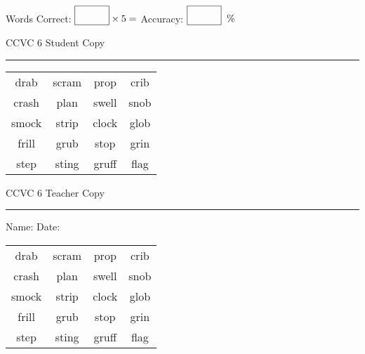 \documentclass{memoir}
\begin{document}
\normalsize

Words Correct: $\fbox{\phantom{\huge 100}} \times 5 = $ Accuracy: $\fbox{\phantom{\huge 100}}\;\; \%$ 

\vfill

\newpage


\footnotesize \noindent
CCVC 6 \hfill Student Copy
\smallskip
\hrule

\Large

\setlength{\tabcolsep}{14pt}
\def\arraystretch{3}

{\selectfont


\begin{vplace}[0.5]
\begin{center}
\begin{tabular}{cccc}
drab             & scram & prop & crib \\
crash & plan & swell & snob \\
smock & strip & clock & glob \\
frill & grub & stop & grin     \\
step & sting & gruff & flag             \\
\end{tabular}
\end{center}
\end{vplace}

}

\newpage

\footnotesize \noindent
CCVC 6 \hfill Teacher Copy
\smallskip
\hrule

\normalsize

\vfill

\noindent
Name: \underline{\hspace{1.75in}} \hfill Date: \underline{\hspace{1in}}

\Large

{\selectfont


\begin{vplace}[0.5]
\begin{center}
\begin{tabular}{cccc}
drab             & scram & prop & crib \\
crash & plan & swell & snob \\
smock & strip & clock & glob \\
frill & grub & stop & grin     \\
step & sting & gruff & flag             \\
\end{tabular}
\end{center}
\end{vplace}



}
\end{document}
